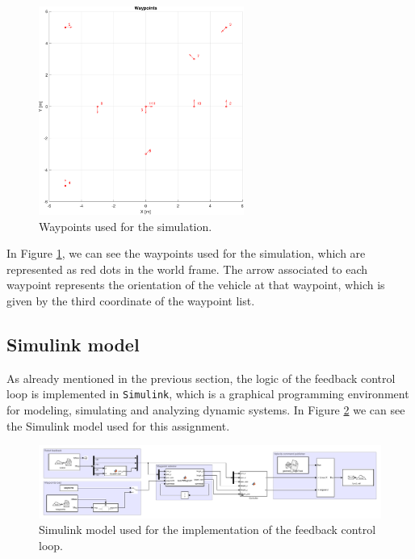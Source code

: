 \begin{figure}[H]
    \centering
    \includegraphics[width=0.6\textwidth]{./img/MATLAB/waypoints.pdf}
    \caption{Waypoints used for the simulation.}
    \label{fig:waypoints}
\end{figure}

In Figure \ref{fig:waypoints}, we can see the waypoints used for the simulation, which are represented as red dots in the world frame.
The arrow associated to each waypoint represents the orientation of the vehicle at that waypoint, which is given by the third coordinate of the waypoint list.



\subsection{Simulink model}
\label{subsec:simulink_model}

As already mentioned in the previous section, the logic of the feedback control loop is implemented in \texttt{Simulink}, which is a graphical programming environment for modeling, simulating and analyzing dynamic systems.
In Figure \ref{fig:simulink_model} we can see the Simulink model used for this assignment.

\begin{figure}[H]
    \centering
    \includegraphics[width=1.0\textwidth]{./img/MATLAB/overview.pdf}
    \caption{Simulink model used for the implementation of the feedback control loop.}
    \label{fig:simulink_model}
\end{figure}

